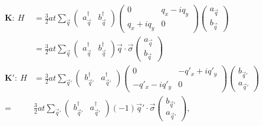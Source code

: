 \begin{align*}
	\bm{K:} \ H&=\frac{3}{2} a t \sum_{\vec q} 
		\left( \begin{array}{cc} a^{\dagger}_{\vec{q}} & b^{\dagger}_{\vec{q}} \end{array} \right)
		\left( \begin{array}{cc}
			0              & q_x - i q_y\\
			q_x+i q_y      & 0                                                 \end{array} \right)
		\left( \begin{array}{c } a_{\vec{q}}           \\ b_{\vec{q}}          \end{array} \right) \\
	  &=\frac{3}{2} a t \sum_{\vec q}
		\left( \begin{array}{cc} a^{\dagger}_{\vec{q}} & b^{\dagger}_{\vec{q}} \end{array} \right)
		\vec{q} \cdot \vec{\sigma}
		\left( \begin{array}{c } a_{\vec{q}}           \\ b_{\vec{q}}          \end{array} \right) \\
	\bm{K':} \ H&=\frac{3}{2} a t \sum_{\vec q'} 
		\left( \begin{array}{cc} b^{\dagger}_{\vec{q}'} & a^{\dagger}_{\vec{q}'} \end{array} \right)
		\left( \begin{array}{cc}
			0              & -q'_x + i q'_y\\
			-q'_x-i q'_y     & 0                                                 \end{array} \right)
		\left( \begin{array}{c } b_{\vec{q}'}           \\ a_{\vec{q}'}          \end{array} \right) \\
	  =&\frac{3}{2} a t \sum_{\vec q'}
		\left( \begin{array}{cc} b^{\dagger}_{\vec{q}'} & a^{\dagger}_{\vec{q}'} \end{array} \right)
		(-1)\vec{q}' \cdot \vec{\sigma}
		\left( \begin{array}{c } b_{\vec{q}'}           \\ a_{\vec{q}'}          \end{array} \right), \\
\end{align*}
